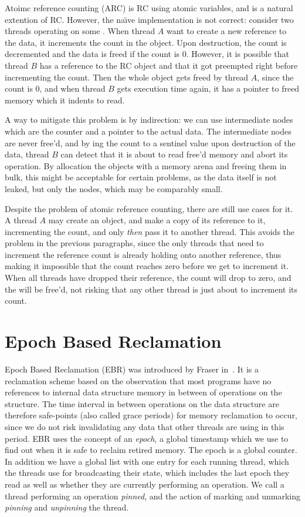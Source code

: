 \documentclass[b5paper]{report}
\begin{document}
Atoimc reference counting (ARC) is RC using atomic variables, and is a natural
extention of RC\@. However, the na\"\i{}ve implementation is not correct:
consider two threads operating on some . When thread $A$ want to
create a new reference to the data, it increments the count in the 
object. Upon destruction, the count is decremented and the data is freed if the
count is 0. However, it is possible that thread $B$ has a reference to the RC
object and that it got preempted right before incrementing the count. Then the
whole object gets freed by thread $A$, since the count is 0, and when thread $B$
gets execution time again, it has a pointer to freed memory which it indents to
read.

A way to mitigate this problem is by indirection: we can use intermediate
 nodes which are the counter and a pointer to the actual data. The
intermediate nodes are never free'd, and by ing the count to a
sentinel value upon destruction of the data, thread $B$ can detect that it is
about to read free'd memory and abort its operation. By allocation the 
objects with a memory arena and freeing them in bulk, this might be acceptable
for certain problems, as the data itself is not leaked, but only the 
nodes, which may be comparably small.

Despite the problem of atomic reference counting, there are still use cases for
it. A thread $A$ may create an  object, and make a copy of its
reference to it, incrementing the count, and only \emph{then} pass it to another
thread. This avoids the problem in the previous paragraphs, since the only
threads that need to increment the reference count is already holding onto
another reference, thus making it impossible that the count reaches zero before
we get to increment it. When all threads have dropped their reference, the
count will drop to zero, and the  will be free'd, not risking that any
other thread is just about to increment its count.
\clearpage
\section{Epoch Based Reclamation}

Epoch Based Reclamation (EBR) was introduced by Fraser
in~\cite{fraser2004practical}. It is a reclamation scheme based on the
observation that most programs have no references to internal data structure
memory in between of operations on the structure. The time interval in between
operations on the data structure are therefore safe-points (also called grace
periods) for memory reclamation to occur, since we do not risk invalidating any
data that other threads are using in this period. EBR uses the concept of an
\emph{epoch}, a global timestamp which we use to find out when it is safe to
reclaim retired memory. The epoch is a global counter. In addition we have a
global list with one entry for each running thread, which the threads use for
broadcasting their state, which includes the last epoch they read as well as
whether they are currently performing an operation. We call a thread performing
an operation \emph{pinned}, and the action of marking and unmarking
\emph{pinning} and \emph{unpinning} the thread.
\end{document}
